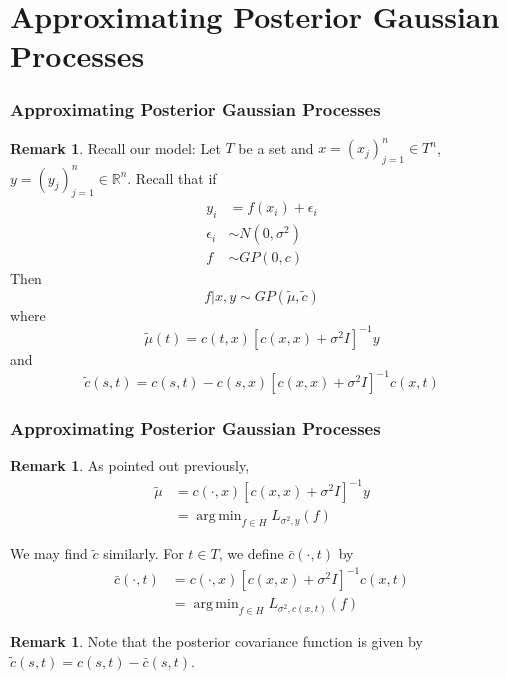 \documentclass[notheorems]{beamer}
\theoremstyle{definition}
\newtheorem{rem}[definition]{Remark}
\newcommand{\ep}{\epsilon}
\newcommand{\sig}{\sigma}
\newcommand{\R}{\mathbb{R}}
\DeclareMathOperator*{\argmin}{arg\,min}
\begin{document}
\section{Approximating Posterior Gaussian Processes}
\begin{frame}
\frametitle{Approximating Posterior Gaussian Processes}
\begin{rem}
Recall our model: Let $T$ be a set and $x = (x_j)_{j=1}^n \in T^n$, $y = (y_j)_{j=1}^n \in \R^n$. Recall that if 
\begin{align*}
y_i &= f(x_i) + \ep_i \\
\ep_i &\sim N(0, \sig^2) \\
f &\sim GP(0, c)
\end{align*}
Then $$f|x, y \sim GP(\tilde{\mu}, \tilde{c})$$ where $$\tilde{\mu}(t) = c(t, x)[c(x,x) + \sig^2I]^{-1}y$$ and $$\tilde{c}(s,t) = c(s,t) - c(s,x)[c(x,x) + \sig^2 I]^{-1}c(x,t)$$

\end{rem}
\end{frame}




























\begin{frame}
\frametitle{Approximating Posterior Gaussian Processes}

\begin{rem}
As pointed out previously, 
\begin{align*}
\tilde{\mu} 
&=  c(\cdot, x)[c(x,x) + \sig^2I]^{-1}y \\
&= \argmin_{f \in H} L_{\sig^2, y} (f)
\end{align*}

We may find $\tilde{c}$ similarly. For $t \in T$, we define $\bar{c}(\cdot, t)$ by
\begin{align*}
\bar{c}(\cdot, t) 
&= c(\cdot, x)[c(x,x) + \sig^2I]^{-1}c(x, t) \\
&= \argmin_{f \in H} L_{\sig^2, c(x,t)} (f)
\end{align*}
\end{rem}
\pause


\begin{rem}
Note that the posterior covariance function is given by $\tilde{c}(s,t) = c(s,t) - \bar{c}(s,t)$.
\end{rem}

\end{frame}
\end{document}
